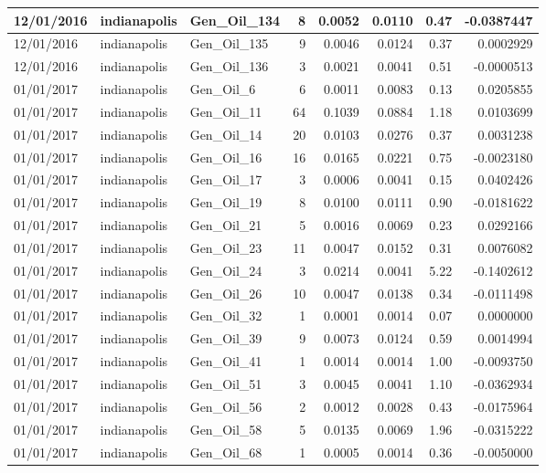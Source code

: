 \documentclass[
  letterpaper,
  DIV=11,
  numbers=noendperiod]{scrartcl}
\begin{document}
\begin{tabular}{l|l|l|r|r|r|r|r}
\hline
12/01/2016 & indianapolis & Gen\_Oil\_134 & 8 & 0.0052 & 0.0110 & 0.47 & -0.0387447\\
\hline
12/01/2016 & indianapolis & Gen\_Oil\_135 & 9 & 0.0046 & 0.0124 & 0.37 & 0.0002929\\
\hline
12/01/2016 & indianapolis & Gen\_Oil\_136 & 3 & 0.0021 & 0.0041 & 0.51 & -0.0000513\\
\hline
01/01/2017 & indianapolis & Gen\_Oil\_6 & 6 & 0.0011 & 0.0083 & 0.13 & 0.0205855\\
\hline
01/01/2017 & indianapolis & Gen\_Oil\_11 & 64 & 0.1039 & 0.0884 & 1.18 & 0.0103699\\
\hline
01/01/2017 & indianapolis & Gen\_Oil\_14 & 20 & 0.0103 & 0.0276 & 0.37 & 0.0031238\\
\hline
01/01/2017 & indianapolis & Gen\_Oil\_16 & 16 & 0.0165 & 0.0221 & 0.75 & -0.0023180\\
\hline
01/01/2017 & indianapolis & Gen\_Oil\_17 & 3 & 0.0006 & 0.0041 & 0.15 & 0.0402426\\
\hline
01/01/2017 & indianapolis & Gen\_Oil\_19 & 8 & 0.0100 & 0.0111 & 0.90 & -0.0181622\\
\hline
01/01/2017 & indianapolis & Gen\_Oil\_21 & 5 & 0.0016 & 0.0069 & 0.23 & 0.0292166\\
\hline
01/01/2017 & indianapolis & Gen\_Oil\_23 & 11 & 0.0047 & 0.0152 & 0.31 & 0.0076082\\
\hline
01/01/2017 & indianapolis & Gen\_Oil\_24 & 3 & 0.0214 & 0.0041 & 5.22 & -0.1402612\\
\hline
01/01/2017 & indianapolis & Gen\_Oil\_26 & 10 & 0.0047 & 0.0138 & 0.34 & -0.0111498\\
\hline
01/01/2017 & indianapolis & Gen\_Oil\_32 & 1 & 0.0001 & 0.0014 & 0.07 & 0.0000000\\
\hline
01/01/2017 & indianapolis & Gen\_Oil\_39 & 9 & 0.0073 & 0.0124 & 0.59 & 0.0014994\\
\hline
01/01/2017 & indianapolis & Gen\_Oil\_41 & 1 & 0.0014 & 0.0014 & 1.00 & -0.0093750\\
\hline
01/01/2017 & indianapolis & Gen\_Oil\_51 & 3 & 0.0045 & 0.0041 & 1.10 & -0.0362934\\
\hline
01/01/2017 & indianapolis & Gen\_Oil\_56 & 2 & 0.0012 & 0.0028 & 0.43 & -0.0175964\\
\hline
01/01/2017 & indianapolis & Gen\_Oil\_58 & 5 & 0.0135 & 0.0069 & 1.96 & -0.0315222\\
\hline
01/01/2017 & indianapolis & Gen\_Oil\_68 & 1 & 0.0005 & 0.0014 & 0.36 & -0.0050000\\

\end{tabular}
\end{document}
